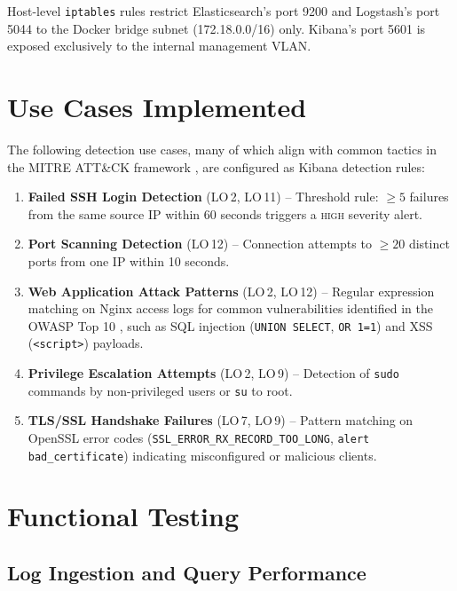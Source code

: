 \documentclass[12pt,a4paper]{report}
\begin{document}
Host-level \texttt{iptables} rules restrict Elasticsearch's port 9200 and Logstash's
port 5044 to the Docker bridge subnet (172.18.0.0/16) only.
Kibana's port 5601 is exposed exclusively to the internal management VLAN.

\section{Use Cases Implemented}

The following detection use cases, many of which align with common tactics in the MITRE ATT\&CK framework \cite{mitre}, are configured as Kibana detection rules:

\begin{enumerate}[leftmargin=1.5em]
    \item \textbf{Failed SSH Login Detection} (LO\,2, LO\,11) -- Threshold rule: \(\geq 5\)
          failures from the same source IP within 60 seconds triggers a \textsc{high} severity alert.
    \item \textbf{Port Scanning Detection} (LO\,12) -- Connection attempts to \(\geq 20\)
          distinct ports from one IP within 10 seconds.
    \item \textbf{Web Application Attack Patterns} (LO\,2, LO\,12) -- Regular expression
          matching on Nginx access logs for common vulnerabilities identified in the OWASP Top 10 \cite{owasp}, such as SQL injection (\texttt{UNION SELECT},
          \texttt{OR 1=1}) and XSS (\texttt{<script>}) payloads.
    \item \textbf{Privilege Escalation Attempts} (LO\,2, LO\,9) -- Detection of
          \texttt{sudo} commands by non-privileged users or \texttt{su} to root.
    \item \textbf{TLS/SSL Handshake Failures} (LO\,7, LO\,9) -- Pattern matching on
          OpenSSL error codes (\texttt{SSL\_ERROR\_RX\_RECORD\_TOO\_LONG},
          \texttt{alert bad\_certificate}) indicating misconfigured or malicious clients.
\end{enumerate}



\section{Functional Testing}

\subsection{Log Ingestion and Query Performance}
\end{document}
